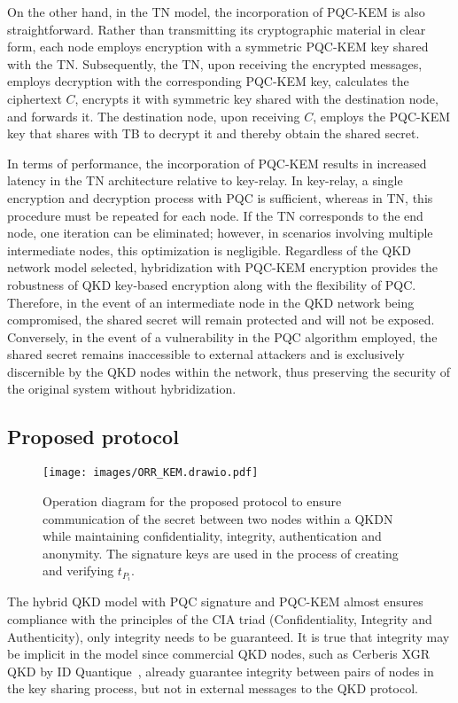 \documentclass[conference]{IEEEtran}
\begin{document}
On the other hand, in the TN model, the incorporation of PQC-KEM is also straightforward. Rather than transmitting its cryptographic material in clear form, each node employs encryption with a symmetric PQC-KEM key shared with the TN. Subsequently, the TN, upon receiving the encrypted messages, employs decryption with the corresponding PQC-KEM key, calculates the ciphertext $C$, encrypts it with symmetric key shared with the destination node, and forwards it. The destination node, upon receiving $C$, employs the PQC-KEM key that shares with TB to decrypt it and thereby obtain the shared secret.

In terms of performance, the incorporation of PQC-KEM results in increased latency in the TN architecture relative to key-relay. In key-relay, a single encryption and decryption process with PQC is sufficient, whereas in TN, this procedure must be repeated for each node. If the TN corresponds to the end node, one iteration can be eliminated; however, in scenarios involving multiple intermediate nodes, this optimization is negligible.
Regardless of the QKD network model selected, hybridization with PQC-KEM encryption provides the robustness of QKD key-based encryption along with the flexibility of PQC. Therefore, in the event of an intermediate node in the QKD network being compromised, the shared secret will remain protected and will not be exposed. Conversely, in the event of a vulnerability in the PQC algorithm employed, the shared secret remains inaccessible to external attackers and is exclusively discernible by the QKD nodes within the network, thus preserving the security of the original system without hybridization.

\subsection{Proposed protocol \label{sec:alg}}

\begin{figure*}[t]
    \centerline{\texttt{[image: images/ORR\_KEM.drawio.pdf]}}
    \caption{Operation diagram for the proposed protocol to ensure communication of the secret between two nodes within a QKDN while maintaining confidentiality, integrity, authentication and anonymity. The signature keys are used in the process of creating and verifying $t_{P_i}$.
    \label{fig:qsn-key-dist}}
\end{figure*}
\raggedbottom

The hybrid QKD model with PQC signature and PQC-KEM almost ensures compliance with the principles of the CIA triad (Confidentiality, Integrity and Authenticity), only integrity needs to be guaranteed. It is true that integrity may be implicit in the model since commercial QKD nodes, such as Cerberis XGR QKD by ID Quantique~\cite{nodes-idq}, already guarantee integrity between pairs of nodes in the key sharing process, but not in external messages to the QKD protocol. 
\end{document}

